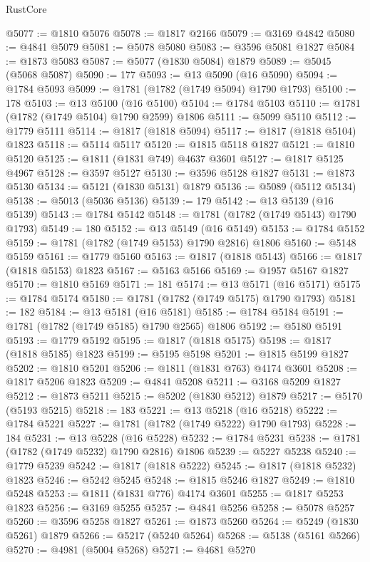 \begin{lexlean}{RustCore}
\begin{coremodule}
@5077 := @1810 @5076
@5078 := @1817 @2166
@5079 := @3169 @4842
@5080 := @4841 @5079
@5081 := @5078 @5080
@5083 := @3596 @5081 @1827
@5084 := @1873 @5083
@5087 := @5077 (@1830 @5084) @1879
@5089 := @5045 (@5068 @5087)
@5090 := 177
@5093 := @13 @5090 (@16 @5090)
@5094 := @1784 @5093
@5099 := @1781 (@1782 (@1749 @5094) @1790 @1793)
@5100 := 178
@5103 := @13 @5100 (@16 @5100)
@5104 := @1784 @5103
@5110 := @1781 (@1782 (@1749 @5104) @1790 @2599) @1806
@5111 := @5099 @5110
@5112 := @1779 @5111
@5114 := @1817 (@1818 @5094)
@5117 := @1817 (@1818 @5104) @1823
@5118 := @5114 @5117
@5120 := @1815 @5118 @1827
@5121 := @1810 @5120
@5125 := @1811 (@1831 @749) @4637 @3601
@5127 := @1817 @5125 @4967
@5128 := @3597 @5127
@5130 := @3596 @5128 @1827
@5131 := @1873 @5130
@5134 := @5121 (@1830 @5131) @1879
@5136 := @5089 (@5112 @5134)
@5138 := @5013 (@5036 @5136)
@5139 := 179
@5142 := @13 @5139 (@16 @5139)
@5143 := @1784 @5142
@5148 := @1781 (@1782 (@1749 @5143) @1790 @1793)
@5149 := 180
@5152 := @13 @5149 (@16 @5149)
@5153 := @1784 @5152
@5159 := @1781 (@1782 (@1749 @5153) @1790 @2816) @1806
@5160 := @5148 @5159
@5161 := @1779 @5160
@5163 := @1817 (@1818 @5143)
@5166 := @1817 (@1818 @5153) @1823
@5167 := @5163 @5166
@5169 := @1957 @5167 @1827
@5170 := @1810 @5169
@5171 := 181
@5174 := @13 @5171 (@16 @5171)
@5175 := @1784 @5174
@5180 := @1781 (@1782 (@1749 @5175) @1790 @1793)
@5181 := 182
@5184 := @13 @5181 (@16 @5181)
@5185 := @1784 @5184
@5191 := @1781 (@1782 (@1749 @5185) @1790 @2565) @1806
@5192 := @5180 @5191
@5193 := @1779 @5192
@5195 := @1817 (@1818 @5175)
@5198 := @1817 (@1818 @5185) @1823
@5199 := @5195 @5198
@5201 := @1815 @5199 @1827
@5202 := @1810 @5201
@5206 := @1811 (@1831 @763) @4174 @3601
@5208 := @1817 @5206 @1823
@5209 := @4841 @5208
@5211 := @3168 @5209 @1827
@5212 := @1873 @5211
@5215 := @5202 (@1830 @5212) @1879
@5217 := @5170 (@5193 @5215)
@5218 := 183
@5221 := @13 @5218 (@16 @5218)
@5222 := @1784 @5221
@5227 := @1781 (@1782 (@1749 @5222) @1790 @1793)
@5228 := 184
@5231 := @13 @5228 (@16 @5228)
@5232 := @1784 @5231
@5238 := @1781 (@1782 (@1749 @5232) @1790 @2816) @1806
@5239 := @5227 @5238
@5240 := @1779 @5239
@5242 := @1817 (@1818 @5222)
@5245 := @1817 (@1818 @5232) @1823
@5246 := @5242 @5245
@5248 := @1815 @5246 @1827
@5249 := @1810 @5248
@5253 := @1811 (@1831 @776) @4174 @3601
@5255 := @1817 @5253 @1823
@5256 := @3169 @5255
@5257 := @4841 @5256
@5258 := @5078 @5257
@5260 := @3596 @5258 @1827
@5261 := @1873 @5260
@5264 := @5249 (@1830 @5261) @1879
@5266 := @5217 (@5240 @5264)
@5268 := @5138 (@5161 @5266)
@5270 := @4981 (@5004 @5268)
@5271 := @4681 @5270

\end{coremodule}
\end{lexlean}
